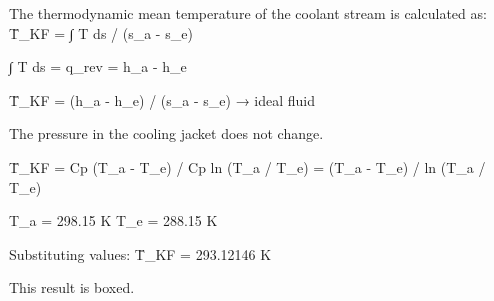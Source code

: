 The thermodynamic mean temperature of the coolant stream is calculated as:  
T̄_KF = ∫ T ds / (s_a - s_e)  

∫ T ds = q_rev = h_a - h_e  

T̄_KF = (h_a - h_e) / (s_a - s_e) → ideal fluid  

The pressure in the cooling jacket does not change.  

T̄_KF = Cp (T_a - T_e) / Cp ln (T_a / T_e) = (T_a - T_e) / ln (T_a / T_e)  

T_a = 298.15 K  
T_e = 288.15 K  

Substituting values:  
T̄_KF = 293.12146 K  

This result is boxed.